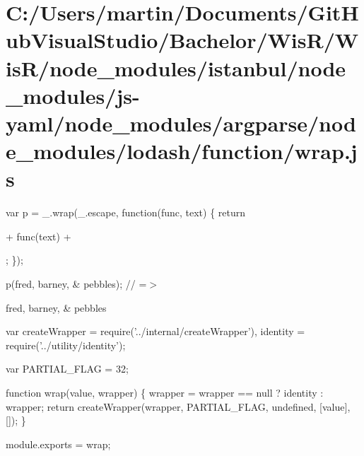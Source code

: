 \hypertarget{_c_1_2_users_2martin_2_documents_2_git_hub_visual_studio_2_bachelor_2_wis_r_2_wis_r_2node_module78f187cbb354b52bc415f19efb84d83c}{}\section{C\+:/\+Users/martin/\+Documents/\+Git\+Hub\+Visual\+Studio/\+Bachelor/\+Wis\+R/\+Wis\+R/node\+\_\+modules/istanbul/node\+\_\+modules/js-\/yaml/node\+\_\+modules/argparse/node\+\_\+modules/lodash/function/wrap.\+js}
var p = \+\_\+.\+wrap(\+\_\+.\+escape, function(func, text) \{ return \textquotesingle{}

\textquotesingle{} + func(text) + \textquotesingle{}

\textquotesingle{}; \});

p(\textquotesingle{}fred, barney, \& pebbles\textquotesingle{}); // =$>$ \textquotesingle{}

fred, barney, \& pebbles

\textquotesingle{}


\begin{DoxyCodeInclude}
var createWrapper = require(\textcolor{stringliteral}{'../internal/createWrapper'}),
    identity = require(\textcolor{stringliteral}{'../utility/identity'});

var PARTIAL\_FLAG = 32;

\textcolor{keyword}{function} wrap(value, wrapper) \{
  wrapper = wrapper == null ? identity : wrapper;
  \textcolor{keywordflow}{return} createWrapper(wrapper, PARTIAL\_FLAG, undefined, [value], []);
\}

module.exports = wrap;
\end{DoxyCodeInclude}
 